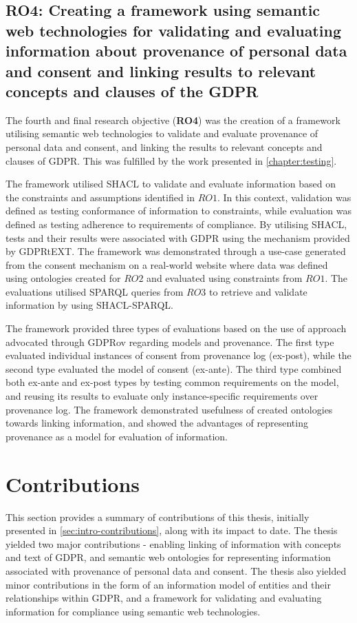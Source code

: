 \subsection*{RO4: Creating a framework using semantic web technologies for validating and evaluating information about provenance of personal data and consent and linking results to relevant concepts and clauses of the GDPR}
The fourth and final research objective (\textbf{RO4}) was the creation of a framework utilising semantic web technologies to validate and evaluate provenance of personal data and consent, and linking the results to relevant concepts and clauses of GDPR. This was fulfilled by the work presented in \autoref{chapter:testing}.

The framework utilised SHACL to validate and evaluate information based on the constraints and assumptions identified in $RO1$. In this context, validation was defined as testing conformance of information to constraints, while evaluation was defined as testing adherence to requirements of compliance. By utilising SHACL, tests and their results were associated with GDPR using the mechanism provided by GDPRtEXT. The framework was demonstrated through a use-case generated from the consent mechanism on a real-world website where data was defined using ontologies created for $RO2$ and evaluated using constraints from $RO1$. The evaluations utilised SPARQL queries from $RO3$ to retrieve and validate information by using SHACL-SPARQL.

The framework provided three types of evaluations based on the use of approach advocated through GDPRov regarding models and provenance. The first type evaluated individual instances of consent from provenance log (ex-post), while the second type evaluated the model of consent (ex-ante). The third type combined both ex-ante and ex-post types by testing common requirements on the model, and reusing its results to evaluate only  instance-specific requirements over provenance log.
The framework demonstrated usefulness of created ontologies towards linking information, and showed the advantages of representing provenance as a model for evaluation of information.

\section{Contributions}\label{sec:conclusion-contributions}
This section provides a summary of contributions of this thesis, initially presented in \autoref{sec:intro-contributions}, along with its impact to date. The thesis yielded two major contributions - enabling linking of information with concepts and text of GDPR, and semantic web ontologies for representing information associated with provenance of personal data and consent. The thesis also yielded minor contributions in the form of an information model of entities and their relationships within GDPR, and a framework for validating and evaluating information for compliance using semantic web technologies.

